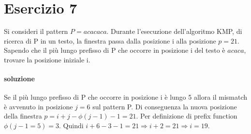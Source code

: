 \section{Esercizio 7}

Si consideri il pattern $P = acacaca$. Durante l'esecuzione dell'algoritmo KMP, di ricerca di P in un testo, la finestra passa dalla posizione i alla posizione $p = 21$.
Sapendo che il pi\`u lungo prefisso di P che occorre in posizione i del testo \`e $acaca$, trovare la posizione iniziale i.

\paragraph{soluzione}

Se il pi\`u lungo prefisso di P che occorre in posizione i \`e lungo 5 allora il mismatch \`e avvenuto in posizione $j = 6$ sul pattern P. Di conseguenza la nuova posizione della finestra $p = i + j - \phi(j-1) - 1 = 21$. Per definizione di prefix function $\phi(j-1=5) = 3$. Quindi $i + 6 - 3 - 1 = 21 \Rightarrow i + 2 = 21 \Rightarrow i = 19$.
